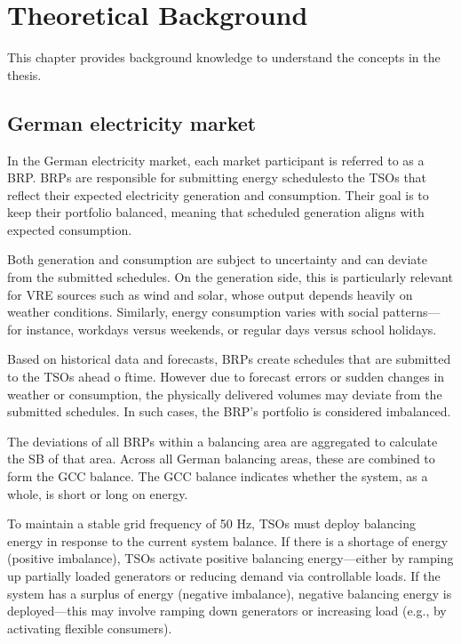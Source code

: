\documentclass[class=scrbook, crop=false]{standalone}
\begin{document}


\chapter{Theoretical Background}
\label{Chapter::Theoretical_Background} %
This chapter provides background knowledge to understand the concepts in the thesis.

\section{German electricity market}
\label{Section::German_Electricity_Market}

In the German electricity market, each market participant is referred to as a \gls{BRP}. \gls{BRP}s are responsible for submitting energy schedulesto the \gls{TSO}s that reflect their expected electricity generation and consumption.
Their goal is to keep their portfolio balanced, meaning that scheduled generation aligns with expected consumption.

Both generation and consumption are subject to uncertainty and can deviate from the submitted schedules. On the generation side, this is particularly relevant for \gls{VRE} sources such as wind and solar, whose output depends heavily on weather conditions. Similarly, energy consumption varies with social patterns—for instance, workdays versus weekends, or regular days versus school holidays. 

Based on historical data and forecasts, \gls{BRP}s create schedules that are submitted to the \gls{TSO}s ahead o ftime. However due to forecast errors or sudden changes in weather or consumption, the physically delivered volumes may deviate from the submitted schedules. In such cases, the \gls{BRP}’s portfolio is considered imbalanced. 

The deviations of all \gls{BRP}s within a balancing area are aggregated to calculate the \gls{SB} of that area. Across all German balancing areas, these are combined to form the \gls{GCC} balance. The  \gls{GCC} balance indicates whether the system, as a whole, is short or long on energy.

To maintain a stable grid frequency of 50 Hz, \gls{TSO}s must deploy balancing energy in response to the current system balance. If there is a shortage of energy (positive imbalance), \gls{TSO}s activate positive balancing energy—either by ramping up partially loaded generators or reducing demand via controllable loads. If the system has a surplus of  energy (negative imbalance), negative balancing energy is deployed—this may involve ramping down generators or increasing load (e.g., by activating flexible consumers). 
\end{document}

